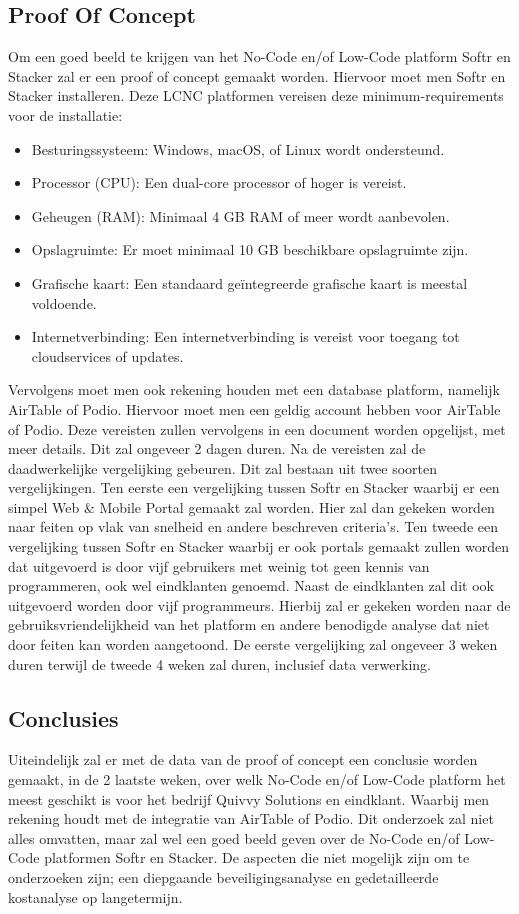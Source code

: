 \subsection*{Proof Of Concept}
\label{sub:proof-of-concept}
Om een goed beeld te krijgen van het No-Code en/of Low-Code platform Softr en Stacker zal er een proof of concept gemaakt worden.
Hiervoor moet men Softr en Stacker installeren. 
Deze LCNC platformen vereisen deze minimum-requirements voor de installatie:
\begin{itemize}
  \item Besturingssysteem: Windows, macOS, of Linux wordt ondersteund.
  \item Processor (CPU): Een dual-core processor of hoger is vereist.
  \item Geheugen (RAM): Minimaal 4 GB RAM of meer wordt aanbevolen.
  \item Opslagruimte: Er moet minimaal 10 GB beschikbare opslagruimte zijn.
  \item Grafische kaart: Een standaard geïntegreerde grafische kaart is meestal voldoende.
  \item Internetverbinding: Een internetverbinding is vereist voor toegang tot cloudservices of updates. 
\end{itemize}
Vervolgens moet men ook rekening houden met een database platform, namelijk AirTable of Podio.
Hiervoor moet men een geldig account hebben voor AirTable of Podio. Deze vereisten zullen vervolgens in een 
document worden opgelijst, met meer details. Dit zal ongeveer 2 dagen duren.
Na de vereisten zal de daadwerkelijke vergelijking gebeuren. Dit zal bestaan uit twee soorten vergelijkingen. Ten eerste
een vergelijking tussen Softr en Stacker waarbij er een simpel Web \& Mobile Portal gemaakt zal worden. Hier zal dan gekeken worden naar feiten op vlak van snelheid en andere beschreven criteria's.
Ten tweede een vergelijking tussen Softr en Stacker waarbij er ook portals gemaakt zullen worden dat uitgevoerd is door vijf gebruikers met weinig tot geen kennis van programmeren, ook wel eindklanten genoemd.
Naast de eindklanten zal dit ook uitgevoerd worden door vijf programmeurs. Hierbij zal er gekeken worden naar de gebruiksvriendelijkheid van het platform en andere benodigde analyse dat niet door feiten kan worden aangetoond.
De eerste vergelijking zal ongeveer 3 weken duren terwijl de tweede 4 weken zal duren, inclusief data verwerking.

\subsection*{Conclusies}
\label{sub:conclusies}
Uiteindelijk zal er met de data van de proof of concept een conclusie worden gemaakt, in de 2 laatste weken, over welk No-Code en/of Low-Code platform het meest geschikt is voor het bedrijf Quivvy Solutions en eindklant. 
Waarbij men rekening houdt met de integratie van AirTable of Podio. Dit onderzoek zal niet alles omvatten, maar zal wel een goed beeld geven over de No-Code en/of Low-Code platformen Softr en Stacker.
De aspecten die niet mogelijk zijn om te onderzoeken zijn; een diepgaande beveiligingsanalyse
en gedetailleerde kostanalyse op langetermijn.


